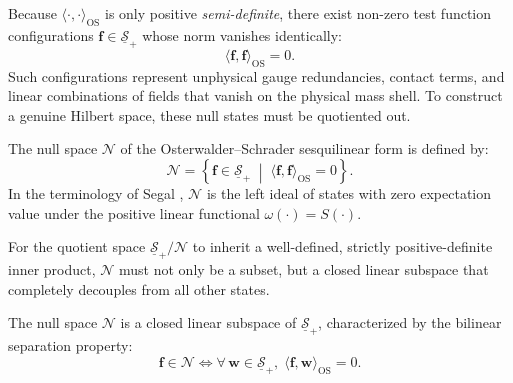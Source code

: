 Because $\langle \cdot, \cdot \rangle_{\mathrm{OS}}$ is only positive \emph{semi-definite}, there exist non-zero test function configurations $\mathbf{f} \in \underline{\mathcal{S}}_+$ whose norm vanishes identically:
\begin{equation}
\langle \mathbf{f}, \mathbf{f} \rangle_{\mathrm{OS}} = 0.
\end{equation}
Such configurations represent unphysical gauge redundancies, contact terms, and linear combinations of fields that vanish on the physical mass shell. To construct a genuine Hilbert space, these null states must be quotiented out.

\begin{definition}
\label{def:null_space}
The null space $\mathcal{N}$ of the Osterwalder--Schrader sesquilinear form is defined by:
\begin{equation}
\label{eq:null_space_def}
\mathcal{N} = \left\{ \mathbf{f} \in \underline{\mathcal{S}}_+ \;\middle|\; \langle \mathbf{f}, \mathbf{f} \rangle_{\mathrm{OS}} = 0 \right\}.
\end{equation}
In the terminology of Segal \cite{Segal1947}, $\mathcal{N}$ is the left ideal of states with zero expectation value under the positive linear functional $\omega(\cdot) = S(\cdot)$.
\end{definition}

For the quotient space $\underline{\mathcal{S}}_+ / \mathcal{N}$ to inherit a well-defined, strictly positive-definite inner product, $\mathcal{N}$ must not only be a subset, but a closed linear subspace that completely decouples from all other states.

\begin{lemma}
\label{lem:null_space_ideal}
The null space $\mathcal{N}$ is a closed linear subspace of $\underline{\mathcal{S}}_+$, characterized by the bilinear separation property:
\begin{equation}
\label{eq:bilinear_separation}
\mathbf{f} \in \mathcal{N} \iff \forall \, \mathbf{w} \in \underline{\mathcal{S}}_+, \; \langle \mathbf{f}, \mathbf{w} \rangle_{\mathrm{OS}} = 0.
\end{equation}
\end{lemma}

